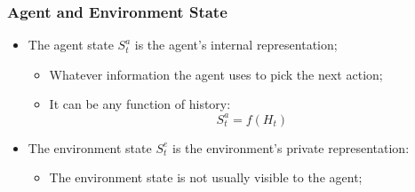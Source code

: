 \begin{frame}
    \frametitle{Agent and Environment State}


    \begin{itemize}
        \item The agent state $S^{a}_t$ is the agent's internal
        representation;

        \begin{itemize}
            \item Whatever information the agent uses to pick the next action;
            \item It can be any function of history:
            $$S^{a}_t = f(H_t)$$
        \end{itemize}

        \item The environment state $S^{e}_t$ is the environment's private
        representation:
        \begin{itemize}
            \item The environment state is not usually visible to the agent;
        \end{itemize}
   


    \end{itemize}
\end{frame}


